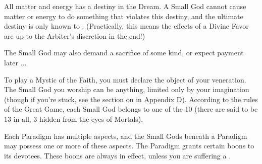 \begin{multicols*}{2}
{  \item All matter and energy has a destiny in the Dream.  A Small God cannot cause matter or energy to do something that violates this destiny, and the ultimate destiny is only known to \TheAuthority. (Practically, this means the effects of a Divine Favor are up to the Arbiter's discretion in the end!)

}


The Small God may also demand a sacrifice of some kind, or expect payment later ...





To play a Mystic of the Faith, you must declare the object of your veneration. The Small God you worship can be anything, limited only by your imagination (though if you're stuck, see the section on  in Appendix D). According to the rules of the Great Game, each Small God belongs to one of the 10  (there are said to be 13 in all, 3 hidden from the eyes of Mortals).



\newpage



Each Paradigm has multiple aspects, and the Small Gods beneath a Paradigm may possess one or more of these aspects. The Paradigm grants certain boons to its devotees.  These boons are always in effect, unless you are suffering a .


\end{multicols*}
